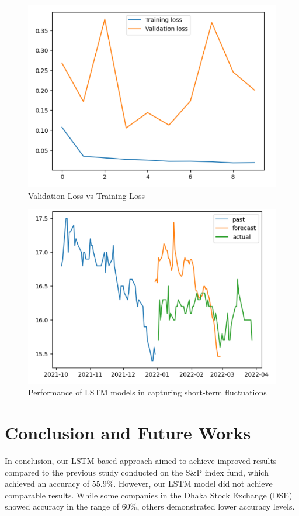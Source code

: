 \documentclass[conference]{IEEEtran}
\begin{document}
\begin{figure}[htbp]
    \centering
    \includegraphics[width=0.975\columnwidth]{fig8.png}
    \caption{Validation Loss vs  Training Loss}
    \label{fig:fig8}
\end{figure}


\begin{figure}[htbp]
    \centering
    \includegraphics[width=0.975\columnwidth]{fig9.png}
    \caption{Performance of LSTM models in capturing short-term fluctuations}
    \label{fig:fig9}
\end{figure}



\section{Conclusion and Future Works}
In conclusion, our LSTM-based approach aimed to achieve improved results compared to the previous study conducted on the S\&P index fund, which achieved an accuracy of 55.9\%\cite{ieee}. However, our LSTM model did not achieve comparable results. While some companies in the Dhaka Stock Exchange (DSE) showed accuracy in the range of 60\%, others demonstrated lower accuracy levels.
\end{document}
